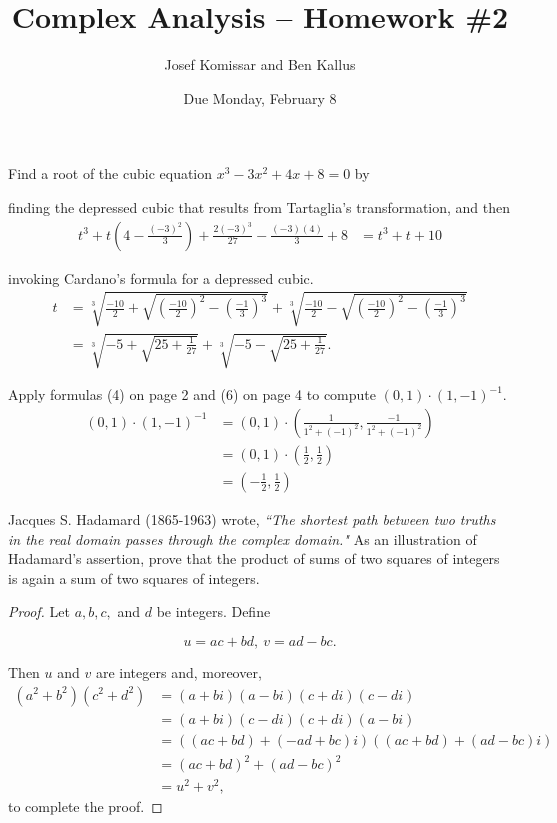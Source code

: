 \documentclass[11pt]{article}       %
\title{Complex Analysis -- Homework \#2}
\author{ Josef Komissar and Ben Kallus }
\date{ Due Monday, February 8 }
\theoremstyle{definition}
\begin{document}
\pagecolor{black}
\color{white}
\maketitle

  Find a root of the cubic equation $x^3-3x^2+4x+8=0$ by

\medskip
{}  finding the depressed cubic that results from Tartaglia's transformation, and then
\begin{align*}
    t^3 + t\left(4 - \frac{(-3)^2}3\right) + \frac{2(-3)^3}{27} - \frac{(-3)(4)}3 + 8 &= t^3 + t + 10
\end{align*}

\medskip
{}  invoking Cardano's formula for a depressed cubic.
\begin{align*}
    t &= \sqrt[3]{\frac{-10}2 + \sqrt{\left(\frac{-10}2\right)^2 - \left(\frac{-1}3\right)^3}} + \sqrt[3]{\frac{-10}2 - \sqrt{\left(\frac{-10}2\right)^2 - \left(\frac{-1}3\right)^3}} \\
    &= \sqrt[3]{-5 + \sqrt{25 +\frac{1}{27}}} + \sqrt[3]{-5 - \sqrt{25 +\frac{1}{27}}}.
\end{align*}

\bigskip
{}  Apply formulas (4) on page 2 and (6) on page 4 to compute $(0,1) \cdot (1,-1)^{-1}$.
\begin{align*}
    (0,1) \cdot (1,-1)^{-1} &= (0,1) \cdot \left(\frac1{1^2 + (-1)^2},\frac{-1}{1^2 + (-1)^2}\right) \\
                            &= (0,1) \cdot \left(\frac12, \frac12\right) \\
                            &= \left(-\frac12, \frac12\right)
\end{align*}

\newpage
{}  Jacques S. Hadamard (1865-1963) wrote, {\sl ``The shortest path between two truths in the real domain passes through the complex domain."}
As an illustration of Hadamard's assertion,  prove that the product of sums of two squares of integers is again a sum of two squares of integers.

\begin{proof}
Let $a, b, c,$ and $d$ be integers.  Define 

$$u=ac+bd,~v=ad-bc.$$

Then $u$ and $v$ are integers and, moreover,
\begin{align*}
(a^2+b^2)(c^2+d^2) &= (a+bi)(a-bi)(c+di)(c-di) \\
                   &= (a+bi)(c-di)(c+di)(a-bi) \\
                   &= ((ac+bd)+(-ad+bc)i)((ac+bd)+(ad-bc)i) \\
                   &= (ac+bd)^2 + (ad-bc)^2 \\
                   &= u^2 + v^2,
\end{align*} to complete the proof.
\end{proof}
\end{document}
